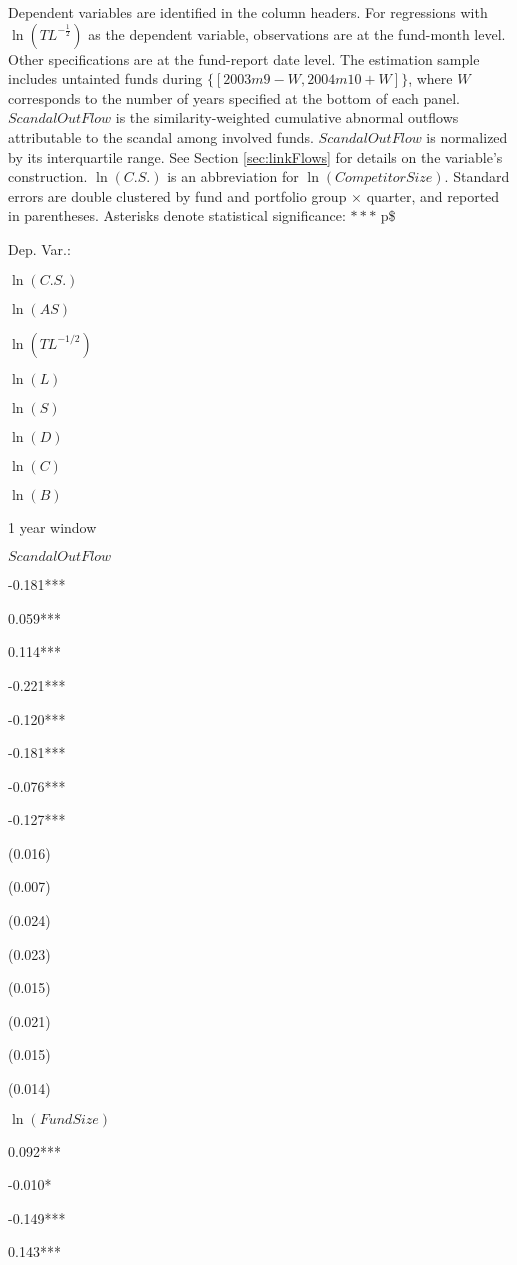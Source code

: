 \documentclass[]{book}
\theoremstyle{definition}
\theoremstyle{definition}
\theoremstyle{definition}
\theoremstyle{remark}
\begin{document}
\label{tab:scandalSpilloverIV} Dependent variables are identified in the
column headers. For regressions with
\(\ln\left(TL^{-\frac{1}{2}}\right)\) as the dependent variable,
observations are at the fund-month level. Other specifications are at
the fund-report date level. The estimation sample includes untainted
funds during \(\{[2003m9-W, 2004m10+W] \}\), where \(W\) corresponds to
the number of years specified at the bottom of each panel.
\(ScandalOutFlow\) is the similarity-weighted cumulative abnormal
outflows attributable to the scandal among involved funds.
\(ScandalOutFlow\) is normalized by its interquartile range. See Section
\ref{sec:linkFlows} for details on the variable's construction.
\(\ln(C.S.)\) is an abbreviation for \(\ln(CompetitorSize)\). Standard
errors are double clustered by fund and portfolio group \(\times\)
quarter, and reported in parentheses. Asterisks denote statistical
significance: \(\ast\ast\ast\) p\$

Dep. Var.:

\(\ln(C.S.)\)

\(\ln(AS)\)

\(\ln(TL^{-1/2})\)

\(\ln(L)\)

\(\ln(S)\)

\(\ln(D)\)

\(\ln(C)\)

\(\ln(B)\)

1 year window

\(ScandalOutFlow\)

-0.181***

0.059***

0.114***

-0.221***

-0.120***

-0.181***

-0.076***

-0.127***

(0.016)

(0.007)

(0.024)

(0.023)

(0.015)

(0.021)

(0.015)

(0.014)

\(\ln(FundSize)\)

0.092***

-0.010*

-0.149***

0.143***
\end{document}
